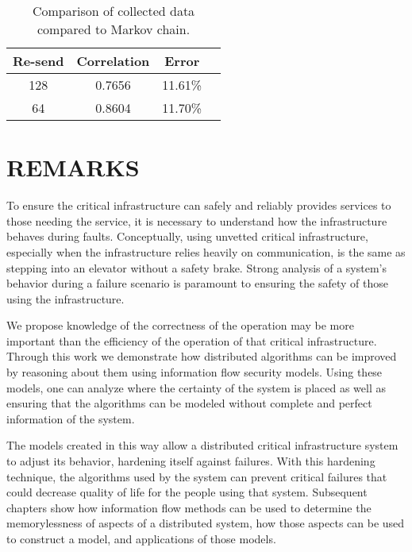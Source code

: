\begin{table}
\caption{Comparison of collected data compared to Markov chain.}
\label{tab:STAT-DATA}
\centering
\begin{tabular}{|c||c|c|c|}
\hline
Re-send & Correlation & Error \\ \hline
128 & 0.7656 & 11.61\% \\ \hline
64 & 0.8604 & 11.70\% \\ \hline
\end{tabular}
\end{table}
\section{REMARKS}

To ensure the critical infrastructure can safely and reliably provides services to those needing the service, it is necessary to understand how the infrastructure behaves during faults.
Conceptually, using unvetted critical infrastructure, especially when the infrastructure relies heavily on communication, is the same as stepping into an elevator without a safety brake.
Strong analysis of a system's behavior during a failure scenario is paramount to ensuring the safety of those using the infrastructure.

We propose knowledge of the correctness of the operation may be more important than the efficiency of the operation of that critical infrastructure.
Through this work we demonstrate how distributed algorithms can be improved by reasoning about them using information flow security models.
Using these models, one can analyze where the certainty of the system is placed as well as ensuring that the algorithms can be modeled without complete and perfect information of the system.

The models created in this way allow a distributed critical infrastructure system to adjust its behavior, hardening itself against failures.
With this hardening technique, the algorithms used by the system can prevent critical failures that could decrease quality of life for the people using that system.
Subsequent chapters show how information flow methods can be used to determine the memorylessness of aspects of a distributed system, how those aspects can be used to construct a model, and applications of those models.

